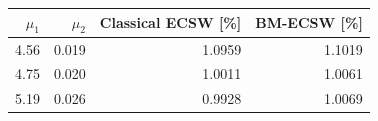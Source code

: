 \begin{tabular}{@{}rrrr@{}}
\toprule
\textbf{$\mu_1$} & \textbf{$\mu_2$} & \textbf{Classical ECSW [\%]} & \textbf{BM-ECSW [\%]}\\
\midrule
4.56 & 0.019 & 1.0959 & 1.1019\\
4.75 & 0.020 & 1.0011 & 1.0061\\
5.19 & 0.026 & 0.9928 & 1.0069\\
\bottomrule
\end{tabular}
